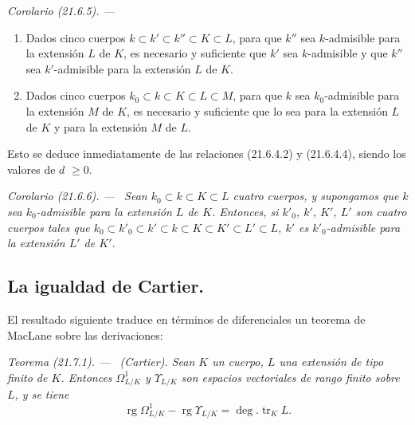 \documentclass[10pt,oneside]{book}
\makeatletter
\newcommand{\setmanualcurrentlabel}[1]{\def\@currentlabel{#1}}
\newcommand{\oldpage}[2][]{%
  \setcounter{footnote}{0}%
  \marginpar{\scriptsize\textbf{#1}~|~#2}\ignorespaces}
\newenvironment{theorem}[1][]{%
  \setmanualcurrentlabel{#1}\par\medskip\noindent\itshape Teorema (#1). ---\ }{\par}
\newenvironment{corollary}[1][]{%
  \setmanualcurrentlabel{#1}\par\medskip\noindent\itshape Corolario (#1). ---\ }{\par}
\providecommand{\setmin}{-}%
\makeatother
\begin{document}
\begin{corollary}[21.6.5]
\label{0.21.6.5-es}
\begin{enumerate}
  \item[\textup{(i)}] Dados cinco cuerpos $k\subset k'\subset k''\subset K\subset L$,
  para que $k''$ sea $k$-admisible para la extensión $L$ de $K$, es necesario y
  suficiente que $k'$ sea $k$-admisible y que $k''$ sea $k'$-admisible
  para la extensión $L$ de $K$.
  \item[\textup{(ii)}] Dados cinco cuerpos
  $k_0\subset k\subset K\subset L\subset M$, para que $k$ sea
  $k_0$-admisible para la extensión $M$ de $K$, es necesario y suficiente que lo
  sea para la extensión $L$ de $K$ y para la extensión $M$ de $L$.
\end{enumerate}
\end{corollary}

Esto se deduce inmediatamente de las relaciones (21.6.4.2) y (21.6.4.4), siendo
los valores de $d$ $\geqslant0$.

\begin{corollary}[21.6.6]
\label{0.21.6.6-es}
Sean $k_0\subset k\subset K\subset L$ cuatro cuerpos, y supongamos que $k$
sea $k_0$-admisible para la extensión $L$ de $K$. Entonces, si $k'_0$, $k'$,
$K'$, $L'$ son cuatro cuerpos tales que
$k_0\subset k'_0\subset k'\subset k\subset K\subset K'\subset L'\subset L$,
$k'$ es $k'_0$-admisible para la extensión $L'$ de $K'$.
\end{corollary}

\subsection{La igualdad de Cartier.}
\label{subsection:0.21.7-es}

El resultado siguiente traduce en términos de diferenciales un teorema de
MacLane sobre las derivaciones:

\oldpage[0\textsubscript{IV-1}]{170}
\begin{theorem}[21.7.1]
\label{0.21.7.1-es}
\textnormal{(Cartier).}
Sean $K$ un cuerpo, $L$ una extensión de tipo finito de $K$. Entonces
$\Omega^1_{L/K}$ y $\Upsilon_{L/K}$ son espacios vectoriales de rango
finito sobre $L$, y se tiene
\begin{equation}
\tag{21.7.1.1}
\label{0.21.7.1.1-es}
\operatorname{rg}\Omega^1_{L/K}\setmin\operatorname{rg}\Upsilon_{L/K}
=\deg.\operatorname{tr}_K L.
\end{equation}
\end{theorem}
\end{document}
